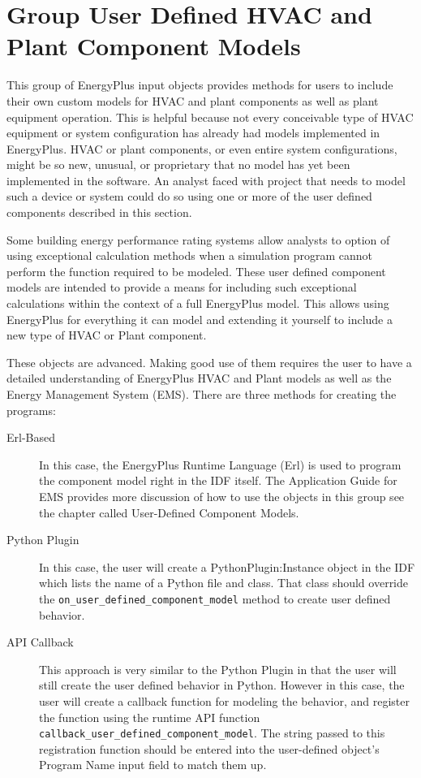 \section{Group User Defined HVAC and Plant Component Models}\label{group-user-defined-hvac-and-plant-component}

This group of EnergyPlus input objects provides methods for users to include their own custom models for HVAC and plant components as well as plant equipment operation. This is helpful because not every conceivable type of HVAC equipment or system configuration has already had models implemented in EnergyPlus. HVAC or plant components, or even entire system configurations, might be so new, unusual, or proprietary that no model has yet been implemented in the software. An analyst faced with project that needs to model such a device or system could do so using one or more of the user defined components described in this section.

Some building energy performance rating systems allow analysts to option of using exceptional calculation methods when a simulation program cannot perform the function required to be modeled. These user defined component models are intended to provide a means for including such exceptional calculations within the context of a full EnergyPlus model. This allows using EnergyPlus for everything it can model and extending it yourself to include a new type of HVAC or Plant component.

These objects are advanced. Making good use of them requires the user to have a detailed understanding of EnergyPlus HVAC and Plant models as well as the Energy Management System (EMS). There are three methods for creating the programs:

\begin{description}
  \item[Erl-Based] In this case, the EnergyPlus Runtime Language (Erl) is used to program the component model right in the IDF itself. The Application Guide for EMS provides more discussion of how to use the objects in this group see the chapter called User-Defined Component Models.
  \item[Python Plugin] In this case, the user will create a PythonPlugin:Instance object in the IDF which lists the name of a Python file and class.  That class should override the \texttt{on\_user\_defined\_component\_model} method to create user defined behavior.
  \item[API Callback] This approach is very similar to the Python Plugin in that the user will still create the user defined behavior in Python.  However in this case, the user will create a callback function for modeling the behavior, and register the function using the runtime API function \texttt{callback\_user\_defined\_component\_model}.  The string passed to this registration function should be entered into the user-defined object's Program Name input field to match them up.
\end{description}


